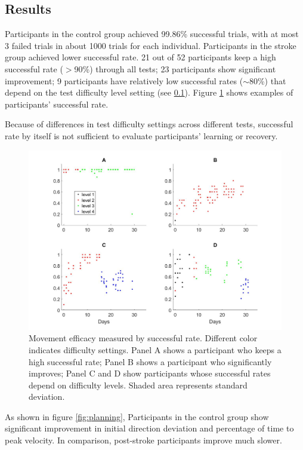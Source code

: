 \subsection{Results}

Participants in the control group achieved 99.86\% successful trials, with at most 3 failed trials in about 1000 trials for each individual.
Participants in the stroke group achieved lower successful rate. 
21 out of 52 participants keep a high successful rate ($>$90\%) through all tests;
23 participants show significant improvement;
9 participants have relatively low successful rates ($\sim$80\%) that depend on the test difficulty level setting (see \ref{}).
Figure \ref{fig:efficacy} shows examples of participants' successful rate.

Because of differences in test difficulty settings across different tests, successful rate by itself is not sufficient to evaluate participants' learning or recovery. 

\begin{figure}
	\centering
	\includegraphics[width=0.8\linewidth]{figures/efficacy}
	\caption[Movement efficacy measured by successful rate.]{Movement efficacy measured by successful rate. Different color indicates difficulty settings. Panel A shows a participant who keeps a high successful rate; Panel B shows a participant who significantly improves; Panel C and D show participants whose successful rates depend on difficulty levels. Shaded area represents standard deviation.}
	\label{fig:efficacy}
\end{figure}

As shown in figure \ref{fig:planning}, Participants in the control group show significant improvement in initial direction deviation and percentage of time to peak velocity. 
In comparison, post-stroke participants improve much slower. 

